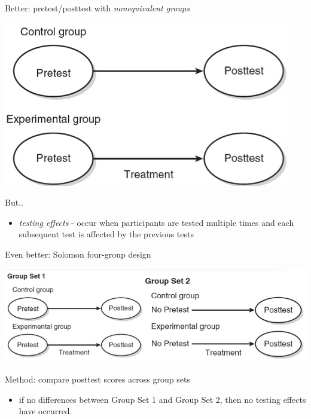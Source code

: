 \documentclass[11pt]{article}
\begin{document}
Better: pretest/posttest with \emph{nonequivalent groups}

\includegraphics[width=.9\linewidth]{figures/prePost2.jpg}

But..
\begin{itemize}
\item \emph{testing effects} - occur when participants are tested multiple times and each subsequent test is affected by the previous tests
\end{itemize}

Even better: Solomon four-group design

\includegraphics[width=.9\linewidth]{figures/solomon.jpg}

Method: compare posttest scores across group sets
\begin{itemize}
\item if no differences between Group Set 1 and Group Set 2, then no testing effects have occurred.
\end{itemize}
\end{document}
